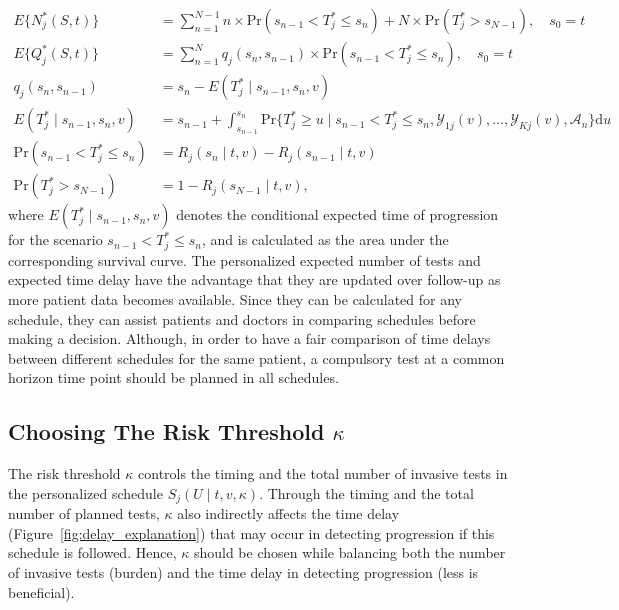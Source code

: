 \begin{equation}
\label{eq:expected_number_of_tests_and_delay}
\begin{split}
E\{N^*_j(S, t)\} &= \sum_{n=1}^{N-1} n \times \mbox{Pr}(s_{n-1} < T^*_j \leq s_n) + N \times \mbox{Pr}(T^*_j > s_{N-1}), \quad s_0 = t\\
E\{Q^*_j(S, t)\} &= \sum_{n=1}^{N} q_j(s_n, s_{n-1}) \times \mbox{Pr}(s_{n-1} < T^*_j \leq s_n) , \quad s_0 = t\\
q_j(s_n, s_{n-1}) &= s_n - E(T^*_j \mid s_{n-1}, s_n, v)\\
E(T^*_j \mid s_{n-1}, s_n, v) &= s_{n-1} + \int_{s_{n-1}}^{s_n} \mbox{Pr}\Big\{T^*_j \geq u \mid s_{n-1} < T^*_j \leq s_n, \mathcal{Y}_{1j}(v), \ldots, \mathcal{Y}_{Kj}(v), \mathcal{A}_n\Big\} \mathrm{d}u\\
\mbox{Pr}(s_{n-1} < T^*_j \leq s_n) &= R_j(s_n \mid t, v) - R_j(s_{n-1} \mid t, v)\\
\mbox{Pr}(T^*_j > s_{N-1}) &= 1- R_j(s_{N-1} \mid t, v),
\end{split}
\end{equation}
where $E(T^*_j \mid s_{n-1}, s_n, v)$ denotes the conditional expected time of progression for the scenario $s_{n-1} < T^*_j \leq s_n$, and is calculated as the area under the corresponding survival curve. The personalized expected number of tests and expected time delay have the advantage that they are updated over follow-up as more patient data becomes available. Since they can be calculated for any schedule, they can assist patients and doctors in comparing schedules before making a decision. Although, in order to have a fair comparison of time delays between different schedules for the same patient, a compulsory test at a common horizon time point should be planned in all schedules.

\subsection{Choosing The Risk Threshold $\kappa$}
The risk threshold $\kappa$ controls the timing and the total number of invasive tests in the personalized schedule $S_j(U \mid t, v, \kappa)$. Through the timing and the total number of planned tests, $\kappa$ also indirectly affects the time delay (Figure~\ref{fig:delay_explanation}) that may occur in detecting progression if this schedule is followed. Hence, $\kappa$ should be chosen while balancing both the number of invasive tests (burden) and the time delay in detecting progression (less is beneficial).


